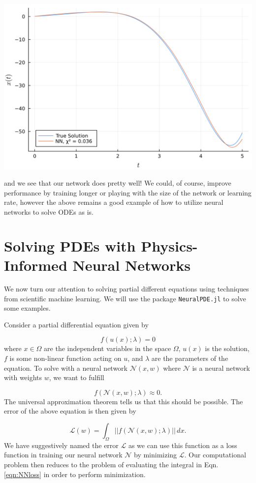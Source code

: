 \documentclass{CUP-JNL-DTM}%
\theoremstyle{definition}
\numberwithin{equation}{section}
\newcommand{\loss}{\mathcal{L}}
\newcommand{\net}{\mathcal{N}}
\begin{document}
\begin{center}
\includegraphics[width=0.42\linewidth]{figures/ODE_example.png}
\end{center}
and we see that our network does pretty well! We could, of course, improve performance by training longer or playing with the size of the network or learning rate, however the above remains a good example of how to utilize neural networks to solve ODEs as is. 


\section{Solving PDEs with Physics-Informed Neural Networks}

We now turn our attention to solving partial different equations using techniques from scientific machine learning. We will use the package \texttt{NeuralPDE.jl} \cite{zubovNeuralPDEAutomatingPhysicsInformed2021} to solve some examples. 

Consider a partial differential equation given by 

\begin{equation}
	f(u(x); \lambda) = 0
\end{equation}
where $x \in \Omega$ are the independent variables in the space $\Omega$, $u(x)$ is the solution, $f$ is some non-linear function acting on $u$, and $\lambda$ are the parameters of the equation. To solve with a neural network $\net(x, w)$ where $\net$ is a neural network with weights $w$, we want to fulfill 

\begin{equation}
	f(\net(x, w); \lambda) \approx 0.
	\label{eqn:NNapprox}
\end{equation}
The universal approximation theorem tells us that this should be possible. The error of the above equation is then given by 

\begin{equation}
	\loss(w) = \int_{\Omega} ||f(\net(x,w); \lambda)||\,dx. 
	\label{eqn:NNloss}
\end{equation}
We have suggestively named the error $\loss$ as we can use this function as a loss function in training our neural network $\net$ by minimizing $\loss$. Our computational problem then reduces to the problem of evaluating the integral in Eqn. \ref{eqn:NNloss} in order to perform minimization. 
\end{document}
